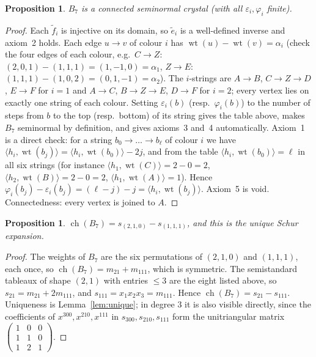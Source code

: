 \documentclass[11pt]{article}
\newtheorem{proposition}[theorem]{Proposition}
\theoremstyle{definition}
\theoremstyle{remark}
\newcommand{\wt}{\operatorname{wt}}
\newcommand{\ch}{\operatorname{ch}}
\begin{document}
\begin{proposition}\label{prop:crystal}
$B_7$ is a connected seminormal crystal (with all $\varepsilon_i,\varphi_i$ finite).
\end{proposition}
\begin{proof}
Each $\tilde f_i$ is injective on its domain, so $\tilde e_i$ is a well-defined inverse and
axiom~2 holds. Each edge $u\to v$ of colour $i$ has $\wt(u)-\wt(v)=\alpha_i$ (check the four
edges of each colour, e.g.\ $C\to Z$: $(2,0,1)-(1,1,1)=(1,-1,0)=\alpha_1$, $Z\to E$:
$(1,1,1)-(1,0,2)=(0,1,-1)=\alpha_2$). The $i$-strings are $A\to B$, $C\to Z\to D$, $E\to F$
for $i=1$ and $A\to C$, $B\to Z\to E$, $D\to F$ for $i=2$; every vertex lies on exactly one
string of each colour. Setting $\varepsilon_i(b)$ (resp.\ $\varphi_i(b)$) to the number of steps
from $b$ to the top (resp.\ bottom) of its string gives the table above, makes $B_7$ seminormal
by definition, and gives axioms~3 and~4 automatically. Axiom~1 is a direct check: for a string
$b_0\to\dots\to b_\ell$ of colour $i$ we have
$\langle h_i,\wt(b_j)\rangle=\langle h_i,\wt(b_0)\rangle-2j$, and from the table
$\langle h_i,\wt(b_0)\rangle=\ell$ in all six strings (for instance
$\langle h_1,\wt(C)\rangle=2-0=2$, $\langle h_2,\wt(B)\rangle=2-0=2$,
$\langle h_1,\wt(A)\rangle=1$). Hence $\varphi_i(b_j)-\varepsilon_i(b_j)=(\ell-j)-j
=\langle h_i,\wt(b_j)\rangle$. Axiom~5 is void. Connectedness: every vertex is joined to $A$.
\end{proof}

\begin{proposition}\label{prop:char}
$\ch(B_7)=s_{(2,1,0)}-s_{(1,1,1)}$, and this is the unique Schur expansion.
\end{proposition}
\begin{proof}
The weights of $B_7$ are the six permutations of $(2,1,0)$ and $(1,1,1)$, each once, so
$\ch(B_7)=m_{21}+m_{111}$, which is symmetric. The semistandard tableaux of shape $(2,1)$ with
entries $\le 3$ are the eight listed above, so $s_{21}=m_{21}+2m_{111}$, and $s_{111}=x_1x_2x_3
=m_{111}$. Hence $\ch(B_7)=s_{21}-s_{111}$. Uniqueness is Lemma~\ref{lem:unique}; in degree $3$
it is also visible directly, since the coefficients of $x^{300},x^{210},x^{111}$ in
$s_{300},s_{210},s_{111}$ form the unitriangular matrix
$\left(\begin{smallmatrix}1&0&0\\1&1&0\\1&2&1\end{smallmatrix}\right)$.
\end{proof}
\end{document}

